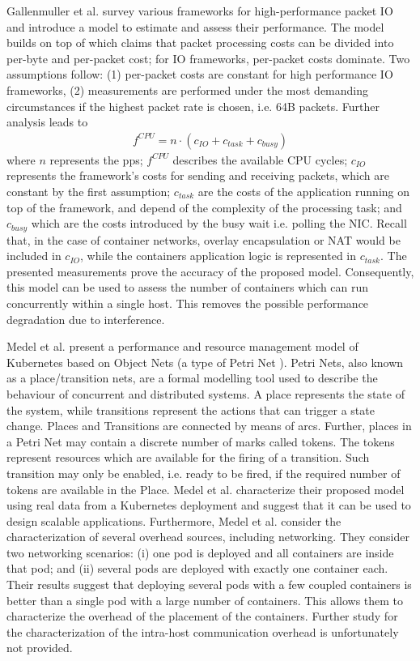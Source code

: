 \documentclass[conference]{IEEEtran}
\begin{document}
Gallenmuller et al. \cite{ANCS:Gallenmuller} survey various frameworks for high-performance packet IO and introduce a model to estimate and assess their performance. The model builds on top of \cite{Rizzo:2012} which claims that packet processing costs can be divided into per-byte and per-packet cost; for IO frameworks, per-packet costs dominate. Two assumptions follow: (1) per-packet costs are constant for high performance IO frameworks, (2) measurements are performed under the most demanding circumstances if the highest packet rate is chosen, i.e. 64B packets. Further analysis leads to
\begin{align}
f^{CPU} = n \cdot (c_{IO}+c_{task}+c_{busy})
\end{align}
\noindent where $n$ represents the pps; $f^{CPU}$ describes the available CPU cycles; $c_{IO}$ represents the framework's costs for sending and receiving packets, which are constant by the first assumption; $c_{task}$ are the costs of the application running on top of the framework, and depend of the complexity of the processing task; and $c_{busy}$ which are the costs introduced by the busy wait i.e. polling the NIC. Recall that, in the case of container networks, overlay encapsulation or NAT would be included in $c_{IO}$, while the containers application logic is represented in $c_{task}$.
The presented measurements prove the accuracy of the proposed model. Consequently, this model can be used to assess the number of containers which can run concurrently within a single host. This removes the possible performance degradation due to interference.

Medel et al. \cite{UCC_2016:Medel} present a performance and resource management model of Kubernetes based on Object Nets \cite{ObjectNets} (a type of Petri Net \cite{PetriNets}). Petri Nets, also known as a place/transition nets, are a formal modelling tool used to describe the behaviour of concurrent and distributed systems. A place represents the state of the system, while transitions represent the actions that can trigger a state change. Places and Transitions are connected by means of arcs. Further, places in a Petri Net may contain a discrete number of marks called tokens. The tokens represent resources which are available for the firing of a transition. Such transition may only be enabled, i.e. ready to be fired, if the required number of tokens are available in the Place. Medel et al. characterize their proposed model using real data from a Kubernetes deployment and suggest that it can be used to design scalable applications. Furthermore, Medel et al. consider the characterization of several overhead sources, including networking. They consider two networking scenarios: (i) one pod is deployed and all containers are inside that pod; and (ii) several pods are deployed with exactly one container each. Their results suggest that deploying several pods with a few coupled containers is better than a single pod with a large number of containers. This allows them to characterize the overhead of the placement of the containers. Further study for the characterization of the intra-host communication overhead is unfortunately not provided.
\end{document}
